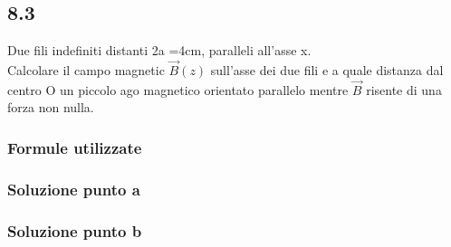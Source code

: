 \documentclass[../../main.tex]{subfiles}
\begin{document}
\subsection*{8.3}
Due fili indefiniti distanti 2a =4cm, paralleli all'asse x.
\\Calcolare il campo magnetic $\vec{B}(z)$ sull'asse dei due fili e a quale distanza dal centro O un piccolo ago magnetico orientato parallelo mentre $\vec{B}$ risente di una forza non nulla.
\subsubsection*{Formule utilizzate}
\subsubsection*{Soluzione punto a}
\subsubsection*{Soluzione punto b}
\newpage
\end{document}
